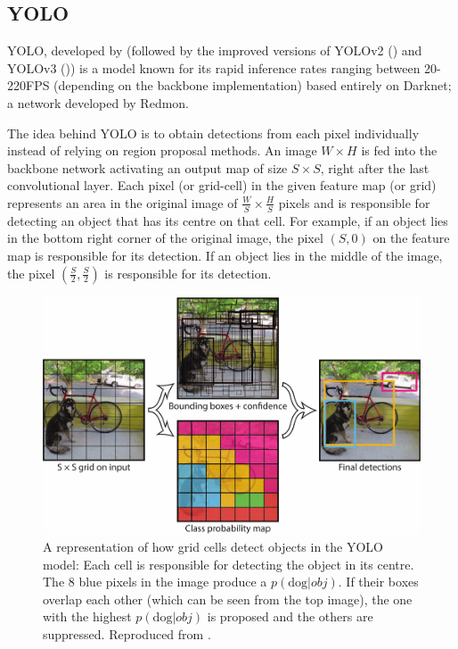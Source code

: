  \subsection{YOLO}
 YOLO, developed by \cite{redmon2016you} (followed by the improved versions of YOLOv2 (\cite{redmon2017yolo9000}) and YOLOv3 (\cite{redmon2018yolov3})) is a model known for its rapid inference 
 rates ranging between 20-220FPS (depending on the backbone implementation) based entirely on Darknet; a network developed by Redmon.
 
The idea behind YOLO is to obtain detections from each pixel individually instead of relying on region proposal methods. An image $W\times H$ is fed into the backbone network activating an output map of size $S\times S$, right after the last convolutional layer. Each pixel (or grid-cell) in the given feature map (or grid) represents an area in the original image of $\frac{W}{S} \times \frac{H}{S}$ pixels and is responsible for detecting an object that has its centre on that cell. For example, if an object lies in the bottom right corner of the original image, the pixel $(S,0)$ on the feature map is responsible for its detection. If an object lies in the middle of the image, the pixel $(\frac{S}{2},\frac{S}{2})$ is responsible for its detection. 
 
\begin{figure}[!htb]
  \centering
  \includegraphics[width=12cm]{figures/ch2/fig5.png}
  \caption{A representation of how grid cells detect objects in the YOLO model: Each cell is responsible for detecting the object in its centre. The 8 blue pixels in the image produce a $p(\text{dog}|obj)$. If their boxes overlap each other (which can be seen from the top image), the one with the highest $p(\text{dog}|obj)$ is proposed and the others are suppressed. Reproduced from \cite{redmon2016you}.}
  \label{ch2:fig5}
\end{figure} 
 

